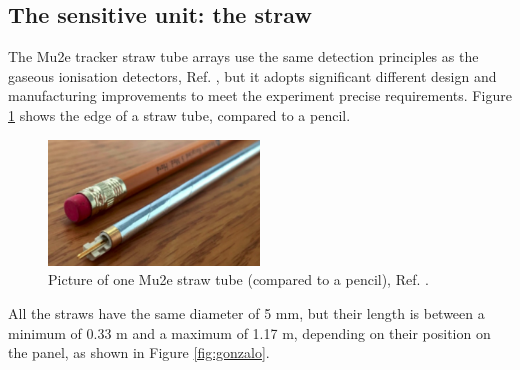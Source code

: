 \subsection{The sensitive unit: the straw}

The Mu2e tracker straw tube arrays use the same detection principles as the gaseous 
ionisation detectors, Ref. \cite{kola}, 
but it adopts significant different design and manufacturing improvements to 
meet the experiment precise requirements.
Figure \ref{fig:trkpencil} shows the edge of a straw tube, compared to a pencil.
\begin{figure}[!h]
    \centering
    \includegraphics[width =0.5\textwidth]{figures/png/Screenshot_20240327_000000.png}
    \caption{Picture of one Mu2e straw tube (compared to a pencil), Ref. \cite{trk}.}
    \label{fig:trkpencil}
    \end{figure}


All the straws have the same diameter of 5 mm, but their length 
is between a minimum of 0.33 m and a maximum of 1.17 m, 
depending on their position on the panel, as shown in Figure \ref{fig:gonzalo}.

